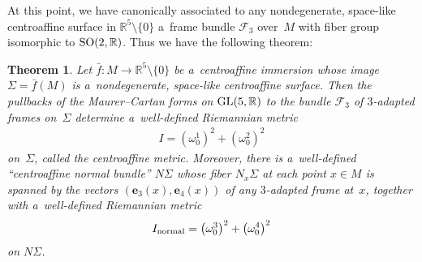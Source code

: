 \documentclass[pdftex]{sigma}
\numberwithin{equation}{section}
\newtheorem{teo}{Theorem}[section]
\theoremstyle{definition}
\begin{document}
At this point, we have canonically associated to any nondegenerate, space-like centroaf\/f\/ine surface in $\mathbb{R}^5
\setminus \{0\}$ a~frame bundle $\mathcal{F}_3$ over~$M$ with f\/iber group isomorphic to ${\rm SO}(2,\mathbb{R})$.
Thus we have the following theorem:

\begin{teo}
\label{space-like-thm}
Let $\bar{f}:M \to \mathbb{R}^5 \setminus\{0\}$ be a~centroaffine immersion whose image $\Sigma = \bar{f}(M)$ is
a~nondegenerate, space-like centroaffine surface.
Then the pullbacks of the Maurer--Cartan forms on ${\rm GL}(5,\mathbb{R})$ to the bundle $\mathcal{F}_3$ of $3$-adapted
frames on~$\Sigma$ determine a~well-defined Riemannian metric
\begin{gather*}
I = \left(\omega^1_0\right)^2 + \left(\omega^2_0\right)^2
\end{gather*}
on~$\Sigma$, called the centroaffine metric.
Moreover, there is a~well-defined ``centroaffine normal bundle'' $N\Sigma$ whose fiber $N_x\Sigma$ at each point $x \in
M$ is spanned by the vectors $(\mathbf{e}_3(x), \mathbf{e}_4(x))$ of any $3$-adapted frame at~$x$, together with
a~well-defined Riemannian metric
\begin{gather*}
I_{\rm normal} = \left(\omega^3_0\right)^2 + \left(\omega^4_0\right)^2
\end{gather*}
on $N\Sigma$.
\end{teo}
\end{document}
